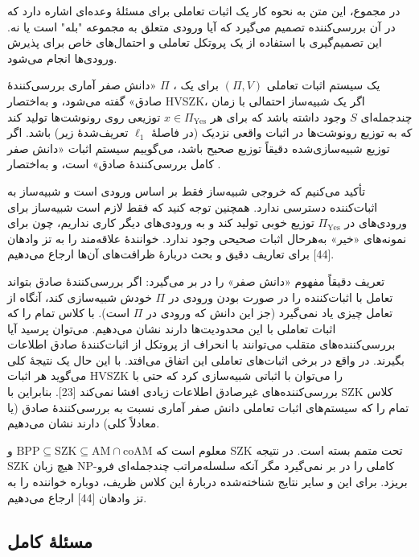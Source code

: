 	در مجموع، این متن به نحوه کار یک اثبات تعاملی برای مسئلهٔ وعده‌ای اشاره دارد که در آن بررسی‌کننده تصمیم می‌گیرد که آیا ورودی متعلق به مجموعه "بله" است یا نه. این تصمیم‌گیری با استفاده از یک پروتکل تعاملی و احتمال‌های خاص برای پذیرش ورودی‌ها انجام می‌شود.
	
یک سیستم اثبات تعاملی $(\Pi, V)$ برای یک
 ، $\Pi$ 
«دانش صفر آماری بررسی‌کنندهٔ صادق» گفته می‌شود، و به‌اختصار HVSZK، اگر یک شبیه‌ساز احتمالی با زمان چندجمله‌ای $S$ وجود داشته باشد که برای هر $x \in \Pi_{\mathrm{Yes}}$ توزیعی روی رونوشت‌ها تولید کند که به توزیع رونوشت‌ها در اثبات واقعی نزدیک (در فاصلهٔ $\ell_1$ تعریف‌شدهٔ زیر) باشد. اگر توزیع شبیه‌سازی‌شده دقیقاً توزیع صحیح باشد، می‌گوییم سیستم اثبات «دانش صفر کامل بررسی‌کنندهٔ صادق» است، و به‌اختصار .

تأکید می‌کنیم که خروجی شبیه‌ساز فقط بر اساس ورودی است و شبیه‌ساز به اثبات‌کننده دسترسی ندارد. همچنین توجه کنید که فقط لازم است شبیه‌ساز برای ورودی‌های در $\Pi_{\mathrm{Yes}}$ توزیع خوبی تولید کند و به ورودی‌های دیگر کاری نداریم، چون برای نمونه‌های «خیر» به‌هرحال اثبات صحیحی وجود ندارد. خوانندهٔ علاقه‌مند را به تز وادهان [44] برای تعاریف دقیق و بحث دربارهٔ ظرافت‌های آن‌ها ارجاع می‌دهیم.

تعریف  دقیقاً مفهوم «دانش صفر» را در بر می‌گیرد: اگر بررسی‌کنندهٔ صادق بتواند تعامل با اثبات‌کننده را در صورت بودن ورودی در $\Pi$ خودش شبیه‌سازی کند، آنگاه از تعامل چیزی یاد نمی‌گیرد (جز این دانش که ورودی در $\Pi$ است). با  کلاس تمام 
 را که اثبات تعاملی با این محدودیت‌ها دارند نشان می‌دهیم. می‌توان پرسید آیا بررسی‌کننده‌های متقلب می‌توانند با انحراف از پروتکل از اثبات‌کنندهٔ صادق اطلاعات بگیرند. در واقع در برخی اثبات‌های تعاملی این اتفاق می‌افتد. با این حال یک نتیجهٔ کلی می‌گوید هر اثبات HVSZK را می‌توان با اثباتی شبیه‌سازی کرد که حتی با بررسی‌کننده‌های غیرصادق اطلاعات زیادی افشا نمی‌کند [23]. بنابراین با SZK کلاس تمام  را که سیستم‌های اثبات تعاملی دانش صفر آماری نسبت به بررسی‌کنندهٔ صادق (یا معادلاً کلی) دارند نشان می‌دهیم.

معلوم است که $\mathrm{BPP} \subseteq \mathrm{SZK} \subseteq \mathrm{AM} \cap \mathrm{coAM}$ و SZK تحت متمم بسته است. در نتیجه SZK هیچ زبان NP-کاملی را در بر نمی‌گیرد مگر آنکه سلسله‌مراتب چندجمله‌ای فرو بریزد. برای این و سایر نتایج شناخته‌شده دربارهٔ این کلاس ظریف، دوباره خواننده را به تز وادهان [44] ارجاع می‌دهیم.
\subsection{ مسئلهٔ کامل}

